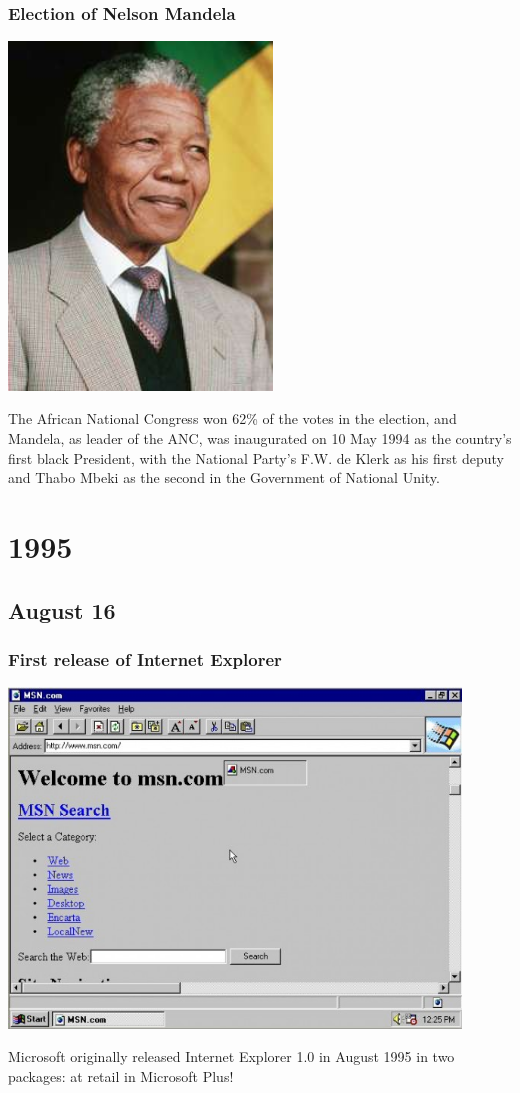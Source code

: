 \documentclass[11pt]{report}
\begin{document}
\subsection{Election of Nelson Mandela}
\vspace{2mm}\begin{center}\includegraphics[width=7cm]{./img/mandela.jpg}\end{center}
The African National Congress won 62\% of the votes in the election, and Mandela, as leader of the ANC, was inaugurated on 10 May 1994 as the country's first black President, with the National Party's F.W. de Klerk as his first deputy and Thabo Mbeki as the second in the Government of National Unity.

\chapter{1995}
\section{August 16}
\subsection{First release of Internet Explorer}
\vspace{2mm}\begin{center}\includegraphics[width=12cm]{./img/internetExplorer.jpg}\end{center}
Microsoft originally released Internet Explorer 1.0 in August 1995 in two packages: at retail in Microsoft Plus!
\end{document}
